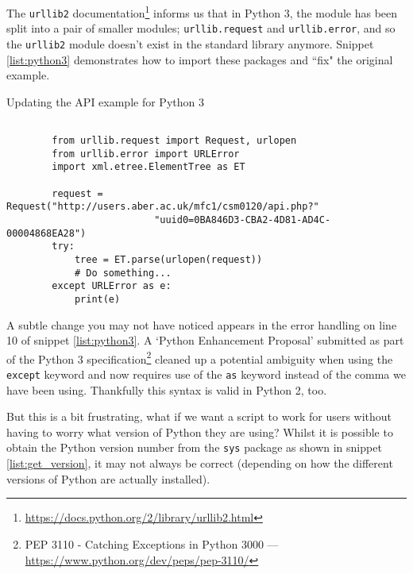 \documentclass[a4paper]{article}
\begin{document}
The \texttt{urllib2} documentation\footnote{{\href{https://docs.python.org/2/library/urllib2.html}{https://docs.python.org/2/library/urllib2.html}}} informs us that in Python 3, the module has been split into a
pair of smaller modules; \texttt{urllib.request} and \texttt{urllib.error}, and so
the \texttt{urllib2} module doesn't exist in the standard library anymore.
Snippet \ref{list:python3} demonstrates how to import these packages and ``fix"
the original example.

\begin{listing}[H]
    \caption[]{Updating the API example for Python 3}
    \label{list:python3}
    \begin{verbatim}

        from urllib.request import Request, urlopen
        from urllib.error import URLError
        import xml.etree.ElementTree as ET

        request = Request("http://users.aber.ac.uk/mfc1/csm0120/api.php?"
                          "uuid0=0BA846D3-CBA2-4D81-AD4C-00004868EA28")
        try:
            tree = ET.parse(urlopen(request))
            # Do something...
        except URLError as e:
            print(e)

    \end{verbatim}
\end{listing}

\pagebreak

A subtle change you may not have noticed appears in the error handling on line
10 of snippet \ref{list:python3}. A `Python Enhancement Proposal' submitted as part of
the Python 3 specification\footnote{PEP 3110 - Catching Exceptions in Python 3000 --- {\href{https://www.python.org/dev/peps/pep-3110/}{https://www.python.org/dev/peps/pep-3110/}}}  cleaned up a potential ambiguity
when using the \texttt{except} keyword and now requires use of the \texttt{as}
keyword instead of the comma we have been using. Thankfully this syntax is valid in
Python 2, too.

But this is a bit frustrating, what if we want a script to work for users without
having to worry what version of Python they are using? Whilst it is possible to
obtain the Python version number from the \texttt{sys} package as shown in
snippet \ref{list:get_version}, it may not always be correct (depending on how
the different versions of Python are actually installed).
\end{document}
